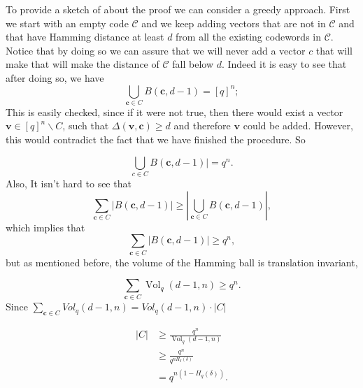 \indent To provide a sketch of about the proof we can consider a greedy approach. First we start with an empty code $\mathcal{C}$ and we keep adding vectors that are not in $\mathcal{C}$ and that have Hamming distance at least $d$ from all the existing codewords in $\mathcal{C}$. Notice that by doing so we can assure that we will never add a vector $c$ that will make that will make the distance of $\mathcal{C}$ fall below $d$. Indeed it is easy to see that after doing so, we have
\begin{equation}
\bigcup_{\mathbf{c} \in C} B(\mathbf{c}, d-1)=[q]^{n};
\label{CH2:Gilbert_Varshamov_1}
\end{equation}
This is easily checked, since if it were not true, then there would exist a vector $\mathbf{v} \in[q]^{n} \backslash C$, such that $\Delta(\mathbf{v}, \mathbf{c}) \geq d$ and therefore $\mathbf{v}$ could be added. However, this would contradict the fact that we have finished the procedure. So

\begin{equation}
\bigcup_{c \in C} B(\mathbf{c}, d-1) \mid=q^{n}.
\label{CH2:Gilbert_Varshamov_2}
\end{equation}
Also, It isn't hard to see that
\begin{equation}
\sum_{\mathbf{c} \in C}|B(\mathbf{c}, d-1)| \geq\left|\bigcup_{\mathbf{c} \in C} B(\mathbf{c}, d-1)\right|,
\label{CH2:Gilbert_Varshamov_3}
\end{equation}
which implies that
\begin{equation}
\sum_{\mathbf{c} \in C}|B(\mathbf{c}, d-1)| \geq q^{n},
\label{CH2:Gilbert_Varshamov_4}
\end{equation}
but as mentioned before, the volume of the Hamming ball is translation invariant,

\begin{equation}
\sum_{\mathbf{c} \in C} \operatorname{Vol}_{q}(d-1, n) \geq q^{n}.
\label{CH2:Gilbert_Varshamov_5}
\end{equation}
Since $\sum_{\mathbf{c} \in C} V o l_{q}(d-1, n)=V o l_{q}(d-1, n) \cdot|C|$ 

\begin{equation}
\begin{aligned}
|C| & \geq \frac{q^{n}}{\operatorname{Vol}_{q}(d-1, n)} \\
& \geq \frac{q^{n}}{q^{n H_{q}(\delta)}} \\
&=q^{n\left(1-H_{q}(\delta)\right)}.
\end{aligned}
\label{CH2:Gilbert_Varshamov_final}
\end{equation}

